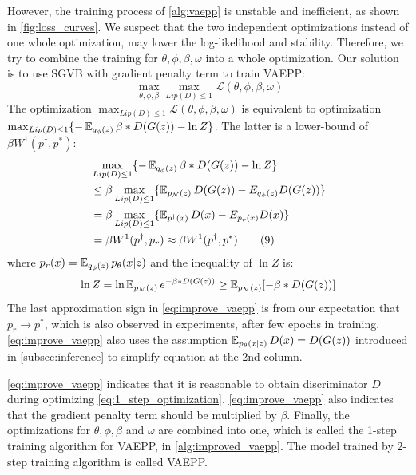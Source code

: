 However, the training process of \cref{alg:vaepp} is unstable and inefficient, as shown in \cref{fig:loss_curves}. 
We suspect that the two independent optimizations instead of one whole optimization, may lower the log-likelihood and stability. Therefore, we try to combine the training for $\theta, \phi, \beta, \omega$ into a whole optimization. 
Our solution is to use SGVB with gradient penalty term to train VAEPP:
\begin{equation*}~\label{eq:1_step_optimization}
	\max_{\theta, \phi, \beta} \max_{Lip(D) \leq 1} \mathcal{L}(\theta, \phi, \beta, \omega) 
\end{equation*} 
The optimization $\max_{Lip(D) \leq 1} \mathcal{L}(\theta, \phi, \beta, \omega)$ is equivalent to optimization $\max_{Lip(D) \leq 1} \{ -\operatorname{\mathbb{E}}_{q_\phi(z)} \beta*D(G(z)) - \ln Z \}$. The latter is a lower-bound of $\beta W^1(p^\dag, p^*)$:
\begin{align*}\label{eq:improve_vaepp}
	&\max_{Lip(D) \leq 1} \{ -\operatorname{\mathbb{E}}_{q_\phi(z)} \beta*D(G(z)) - \ln Z \}\\ 
	&\leq \beta \max_{Lip(D) \leq 1} \{ \operatorname{\mathbb{E}}_{p_\mathcal{N}(z)} D(G(z)) - E_{q_\phi(z)} D(G(z)) \} \\
	&= \beta \max_{Lip(D) \leq 1} \{ \operatorname{\mathbb{E}}_{p^\dag(x)} D(x) - E_{p_r(x)} D(x) \} \\
	&= \beta W^1(p^\dag, p_r) \approx \beta W^1(p^\dag, p^*) \tag{9} 
\end{align*}
where $p_r(x) = \operatorname{\mathbb{E}}_{q_\phi(z)} p_\theta(x|z)$ and the inequality of $\ln Z$ is:
\begin{equation*}
	\ln Z = \ln \operatorname{\mathbb{E}}_{p_\mathcal{N}(z)} e^{- \beta * D(G(z))} \geq \operatorname{\mathbb{E}}_{p_\mathcal{N}(z)} [- \beta * D(G(z))]
\end{equation*}
The last approximation sign in \cref{eq:improve_vaepp} is from our expectation that $p_r \rightarrow p^*$, which is also observed in experiments, after few epochs in training. \cref{eq:improve_vaepp} also uses the assumption $\operatorname{\mathbb{E}}_{p_\theta(x|z)} D(x) = D(G(z))$ introduced in \cref{subsec:inference} to simplify equation at the 2nd column. 

\cref{eq:improve_vaepp} indicates that it is reasonable to obtain  discriminator $D$ during optimizing \cref{eq:1_step_optimization}. \cref{eq:improve_vaepp} also indicates that the gradient penalty term should be multiplied by $\beta$. Finally, the optimizations for $\theta, \phi, \beta$ and $\omega$ are combined into one, which is called the 1-step training algorithm for VAEPP, in \cref{alg:improved_vaepp}. The model trained by 2-step training algorithm is called VAEPP. 


